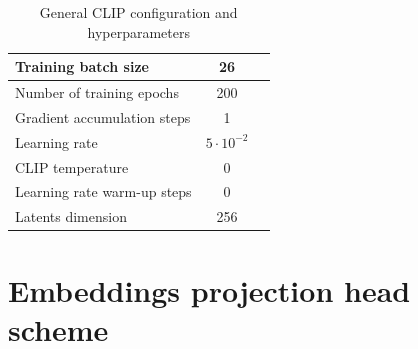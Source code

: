 \documentclass[runningheads]{llncs}
\begin{document}
\begin{table}[H]\footnotesize
  \centering
  \caption{General CLIP configuration and hyperparameters}
  {\begin{tabular}{|l|c|c|} 
        \hline
        Training batch size & 26 \\
        \hline
        Number of training epochs & 200 \\
        \hline
        Gradient accumulation steps & 1 \\
        \hline
        Learning rate & $5 \cdot 10^{-2}$ \\
        \hline
        CLIP temperature & 0 \\
        \hline
        Learning rate warm-up steps & 0 \\
        \hline
        Latents dimension & 256 \\
        \hline
  \end{tabular}}
  \label{tab:CLIP hyperparameters}
\end{table}


\section{Embeddings projection head scheme}
\label{app:projection_head}
\end{document}
